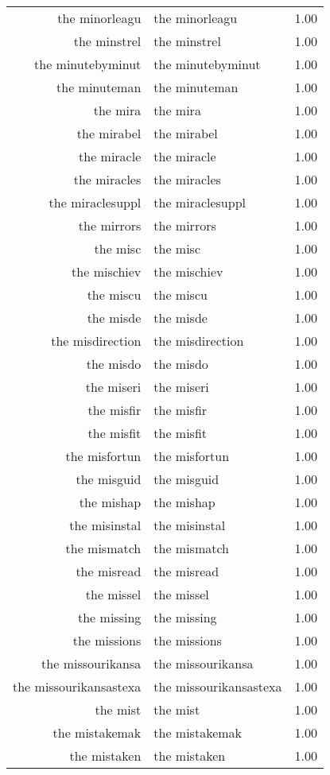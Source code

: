 \begin{table}[ht]
\begin{tabular}{rlr}
  the minorleagu & the minorleagu & 1.00 \\ 
  the minstrel & the minstrel & 1.00 \\ 
  the minutebyminut & the minutebyminut & 1.00 \\ 
  the minuteman & the minuteman & 1.00 \\ 
  the mira & the mira & 1.00 \\ 
  the mirabel & the mirabel & 1.00 \\ 
  the miracle & the miracle & 1.00 \\ 
  the miracles & the miracles & 1.00 \\ 
  the miraclesuppl & the miraclesuppl & 1.00 \\ 
  the mirrors & the mirrors & 1.00 \\ 
  the misc & the misc & 1.00 \\ 
  the mischiev & the mischiev & 1.00 \\ 
  the miscu & the miscu & 1.00 \\ 
  the misde & the misde & 1.00 \\ 
  the misdirection & the misdirection & 1.00 \\ 
  the misdo & the misdo & 1.00 \\ 
  the miseri & the miseri & 1.00 \\ 
  the misfir & the misfir & 1.00 \\ 
  the misfit & the misfit & 1.00 \\ 
  the misfortun & the misfortun & 1.00 \\ 
  the misguid & the misguid & 1.00 \\ 
  the mishap & the mishap & 1.00 \\ 
  the misinstal & the misinstal & 1.00 \\ 
  the mismatch & the mismatch & 1.00 \\ 
  the misread & the misread & 1.00 \\ 
  the missel & the missel & 1.00 \\ 
  the missing & the missing & 1.00 \\ 
  the missions & the missions & 1.00 \\ 
  the missourikansa & the missourikansa & 1.00 \\ 
  the missourikansastexa & the missourikansastexa & 1.00 \\ 
  the mist & the mist & 1.00 \\ 
  the mistakemak & the mistakemak & 1.00 \\ 
  the mistaken & the mistaken & 1.00 \\ 

\end{tabular}
\end{table}
